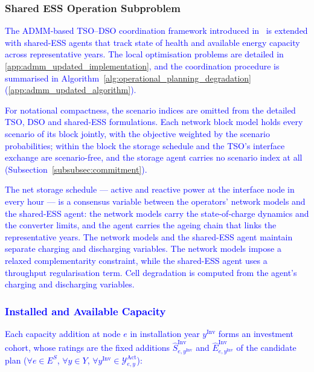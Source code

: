 \documentclass[preprint,12pt]{elsarticle}
\begin{document}
\subsubsection{Shared ESS Operation Subproblem}

\textcolor{blue}{
    The ADMM-based TSO--DSO coordination framework introduced in~\cite{simoes_2023} is extended with shared-ESS agents that track state of health and available energy capacity across representative years. The local optimisation problems are detailed in \ref{app:admm_updated_implementation}, and the coordination procedure is summarised in Algorithm~\ref{alg:operational_planning_degradation} (\ref{app:admm_updated_algorithm}).
}

\textcolor{blue}{
    For notational compactness, the scenario indices are omitted from the detailed TSO, DSO and shared-ESS formulations. Each network block model holds every scenario of its block jointly, with the objective weighted by the scenario probabilities; within the block the storage schedule and the TSO's interface exchange are scenario-free, and the storage agent carries no scenario index at all (Subsection~\ref{subsubsec:commitment}).
}

\textcolor{blue}{
    The net storage schedule --- active and reactive power at the interface node in every hour --- is a consensus variable between the operators' network models and the shared-ESS agent: the network models carry the state-of-charge dynamics and the converter limits, and the agent carries the ageing chain that links the representative years. 
    The network models and the shared-ESS agent maintain separate charging and discharging variables. The network models impose a relaxed complementarity constraint, while the shared-ESS agent uses a throughput regularisation term. Cell degradation is computed from the agent's charging and discharging variables.
}

\subsubsection{\textcolor{blue}{Installed and Available Capacity}}

\textcolor{blue}{
    Each capacity addition at node $e$ in installation year $y^{\text{Inv}}$ forms an investment cohort, whose ratings are the fixed additions $\hat{S}^{\text{Inv}}_{e,y^{\text{Inv}}}$ and $\hat{E}^{\text{Inv}}_{e,y^{\text{Inv}}}$ of the candidate plan ($\forall e\in E^S$, $\forall y\in Y$, $\forall y^{\text{Inv}}\in\mathcal{Y}^{\text{Act}}_{e,y}$):
}
\end{document}

